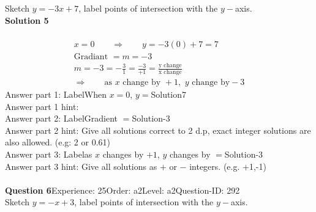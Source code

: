 \documentclass{article}
\begin{document}
Sketch $y=-3x+7$, label points of intersection with the $y-$axis.\\[4pt]
\noindent\textbf{Solution 5}\\[2pt]
\\[-35pt]\begin{align*}
&x=0\qquad\Rightarrow\qquad y=-3(0)+7=7&\\[2pt]
&\text{Gradiant}\,\,=m=-3&\\[2pt]
&m=-3=-\displaystyle\frac{3}{1}=\displaystyle\frac{-3}{+1}=\displaystyle\frac{\text{y change}}{\text{x change}}&\\[2pt]
& \Rightarrow\qquad \text{as}\,\, x \,\,\text{change by } +1,\,\, y\,\, \text{change by} -3 &
\end{align*}
Answer part 1: \hspace{10pt}Label\hspace{10pt}When $x=0$, $y=$\hspace{10pt}Solution\hspace{10pt}7\\
Answer part 1 hint: \hspace{15pt}\\
Answer part 2: \hspace{10pt}Label\hspace{10pt}Gradient $=$\hspace{10pt}Solution\hspace{10pt}-3\\
Answer part 2 hint: \hspace{15pt}Give all solutions correct to 2 d.p, exact integer solutions are also allowed. (e.g: 2 or 0.61)\\
Answer part 3: \hspace{10pt}Label\hspace{10pt}as $x$ changes by $+1$, $y$ changes by $=$\hspace{10pt}Solution\hspace{10pt}-3\\
Answer part 3 hint: \hspace{15pt}Give all solutions as $+$ or $-$ integers. (e.g. +1,-1)\\
\\[4pt]
\noindent\textbf{Question 6}\hspace{20pt}Experience: 25\hspace{20pt}Order: a2\hspace{20pt}Level: a2\hspace{20pt}Question-ID: 292\\[2pt]
Sketch $y=-x+3$, label points of intersection with the $y-$axis.\\[4pt]
\end{document}
